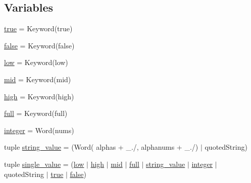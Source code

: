 \subsection*{Variables}
\begin{DoxyCompactItemize}
\item 
\hyperlink{namespacesylva_1_1misc_1_1tcl__parser_a69ee465af30df5bf43aeceff5d2575f5}{true} = Keyword(\textquotesingle{}true\textquotesingle{})
\item 
\hyperlink{namespacesylva_1_1misc_1_1tcl__parser_afd24314ff35451e53749e5b88bfded24}{false} = Keyword(\textquotesingle{}false\textquotesingle{})
\item 
\hyperlink{namespacesylva_1_1misc_1_1tcl__parser_a3e7d379d24d71398245bc0928adf3d96}{low} = Keyword(\textquotesingle{}low\textquotesingle{})
\item 
\hyperlink{namespacesylva_1_1misc_1_1tcl__parser_afc97598c7f63cc5c0edee20b2c6e1841}{mid} = Keyword(\textquotesingle{}mid\textquotesingle{})
\item 
\hyperlink{namespacesylva_1_1misc_1_1tcl__parser_ae1450b8eb1791d39aebf72a6339c13ed}{high} = Keyword(\textquotesingle{}high\textquotesingle{})
\item 
\hyperlink{namespacesylva_1_1misc_1_1tcl__parser_acc30be6956c891e9bf8b6f3125e40e14}{full} = Keyword(\textquotesingle{}full\textquotesingle{})
\item 
\hyperlink{namespacesylva_1_1misc_1_1tcl__parser_aaa6da6af48cbfc02e2f6edd078ea16ab}{integer} = Word(nums)
\item 
tuple \hyperlink{namespacesylva_1_1misc_1_1tcl__parser_a5f1213f66ee68863fc66dc54ceec2d1e}{string\+\_\+value} = (Word( alphas + \textquotesingle{}\+\_\+./\textquotesingle{}, alphanums + \textquotesingle{}\+\_\+./\textquotesingle{}) $\vert$ quoted\+String)
\item 
tuple \hyperlink{namespacesylva_1_1misc_1_1tcl__parser_a92069bbdbd952a10c724671781cfcfd6}{single\+\_\+value} = (\hyperlink{namespacesylva_1_1misc_1_1tcl__parser_a3e7d379d24d71398245bc0928adf3d96}{low} $\vert$ \hyperlink{namespacesylva_1_1misc_1_1tcl__parser_ae1450b8eb1791d39aebf72a6339c13ed}{high} $\vert$ \hyperlink{namespacesylva_1_1misc_1_1tcl__parser_afc97598c7f63cc5c0edee20b2c6e1841}{mid} $\vert$ \hyperlink{namespacesylva_1_1misc_1_1tcl__parser_acc30be6956c891e9bf8b6f3125e40e14}{full} $\vert$ \hyperlink{namespacesylva_1_1misc_1_1tcl__parser_a5f1213f66ee68863fc66dc54ceec2d1e}{string\+\_\+value} $\vert$ \hyperlink{namespacesylva_1_1misc_1_1tcl__parser_aaa6da6af48cbfc02e2f6edd078ea16ab}{integer} $\vert$ quoted\+String $\vert$ \hyperlink{namespacesylva_1_1misc_1_1tcl__parser_a69ee465af30df5bf43aeceff5d2575f5}{true} $\vert$ \hyperlink{namespacesylva_1_1misc_1_1tcl__parser_afd24314ff35451e53749e5b88bfded24}{false})

\end{DoxyCompactItemize}
